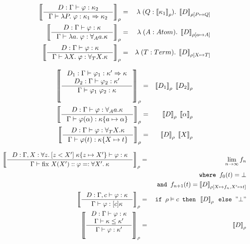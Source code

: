 \documentclass[english, mgr]{iithesis}
\begin{document}
\begin{eqnarray*}
    \interp{\inference{D : \types{\formphi}{\kind_2}}{\types{\lam[\propv]\formphi}{\kind_1\karr\kind_2}}} & = &
    \lambda\;(Q : \interp{\kind_1}).\;\interp[{\tmEnv[\propv\mapsto Q]}]{D}
    \\
    \interp{\inference{D: \types{\formphi}{\kind}}{\types{\lam[\atomv]\formphi}{\kForallAtom{\atomv}\kind}}} & = &
    \lambda\;(A : Atom).\;\interp[{\tmEnv[\atomv\mapsto A]}]{D}
    \\
    \interp{\inference{D: \types{\formphi}{\kind}}{\types{\lam[\termv]\formphi}{\kForallTerm{\termv}\kind}}} & = &
    \lambda\;(T : Term).\;\interp[{\tmEnv[\termv\mapsto T]}]{D}
\end{eqnarray*}

\begin{eqnarray*}
    \interp{\inference{D_1: \types{\formphi_1}{\kind'\karr\kind} \\ D_2: \types{\formphi_2}{\kind'}}{\types{\formphi_1\;\formphi_2}{\kind}}} & = &
    \interp{D_1}\; \interp{D_2}
    \\
    \interp{\inference{D: \types{\formphi}{\kForallAtom{\atomv}\kind}}{\types{\formphi(\atomexp)}{\kind\{\atomv \mapsto \atomexp\}}}} & = &
    \interp{D}\;\interp{\atomexp}
    \\
    \interp{\inference{D: \types{\formphi}{\kForallTerm{\termv}\kind}}{\types{\formphi(\term)}{\kind\{\termv \mapsto \term\}}}} & = &
    \interp{D}\;\interp{\termv}
\end{eqnarray*}

\begin{eqnarray*}
    \interp{\inference{
            D : \types[{\Gamma, X : {\all[z]{[z < \termv']}}\;\kind\subst{z}{\termv'}}]\formphi\kind
        }{
            \types{\fix{X}{\termv'}\formphi}{\all[\termv']\kind}
        }} & = & \lim_{n \rightarrow \infty} f_n
    \\
    & & \texttt{ where } f_0(t) = \bot \\
    & & \texttt{ and } f_{n+1}(t) = \interp[{\tmEnv[X\mapsto f_n, \termv' \mapsto t]}]{D} \\
    \interp{\inference{
            D : \types[\Gamma, c]\formphi\kind
        }{
            \types{\formphi}{[c]\kind}
        }} & = & \texttt{if } \tmEnv \vDash c \texttt{ then } \interp{D} \texttt{ else } \text{''}\bot\text{''}
    \\
    \interp{\inference{
            D : \types\formphi\kind \\
            \rel[\Gamma] \kind \leq \kind'
        }{
            \types{\formphi}{\kind'}
        }} & = &  \interp{D}
\end{eqnarray*}
\end{document}
